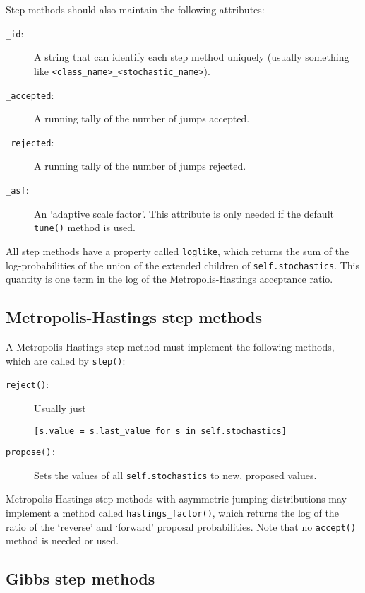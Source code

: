 Step methods should also maintain the following attributes:
\begin{description}
   \item[\texttt{_id}:] A string that can identify each step method uniquely (usually something like \texttt{<class_name>_<stochastic_name>}).
   \item[\texttt{_accepted}:] A running tally of the number of jumps accepted.
   \item[\texttt{_rejected}:] A running tally of the number of jumps rejected.   
   \item[\texttt{_asf}:] An `adaptive scale factor'. This attribute is only needed if the default \texttt{tune()} method is used.
\end{description}

All step methods have a property called \texttt{loglike}, which returns the sum of the log-probabilities of the union of the extended children of \texttt{self.stochastics}. This quantity is one term in the log of the Metropolis-Hastings acceptance ratio.


\hypertarget{user-metro}{}
\subsection*{Metropolis-Hastings step methods} \label{user-metro}
A Metropolis-Hastings step method must implement the following methods, which are called by \texttt{step()}:
\begin{description}

   \item[\texttt{reject()}:] Usually just
   \begin{verbatim}
[s.value = s.last_value for s in self.stochastics]
   \end{verbatim}
   \item[\texttt{propose():}] Sets the values of all \texttt{self.stochastics} to new, proposed values.
\end{description}
Metropolis-Hastings step methods with asymmetric jumping distributions may implement a method called \texttt{hastings_factor()}, which returns the log of the ratio of the `reverse' and `forward' proposal probabilities. Note that no \texttt{accept()} method is needed or used.

\hypertarget{user-gibbs}{}
\subsection*{Gibbs step methods} \label{user-gibbs}

